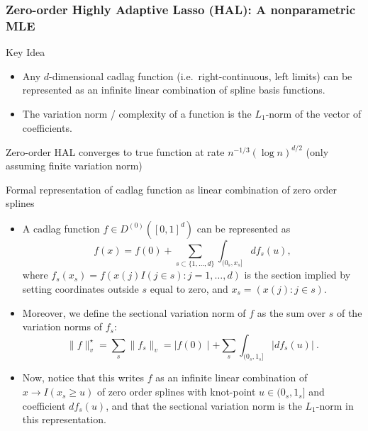 \documentclass[t]{beamer}
\begin{document}
\begin{frame}
\frametitle{Zero-order Highly Adaptive Lasso (HAL): A nonparametric MLE}
\begin{block}{\large{Key Idea}}
\begin{itemize}
\vspace{.1in}
\item Any $d$-dimensional cadlag function (i.e.~right-continuous, left limits)
can be represented as an infinite linear combination of spline basis functions.
\vspace{.05in}
\item The variation norm / complexity of a function is the $L_1$-norm of the vector of coefficients.
\vspace{.1in}
\end{itemize}
\end{block}
\vspace{0.25in}
\begin{center}
{\large Zero-order HAL converges to true function at rate $n^{-1/3}(\log n)^{d/2}$ (only assuming finite variation norm)}
\end{center}
\end{frame}

\begin{frame}{Formal representation of cadlag function as linear combination of zero order splines}
\begin{itemize}
\item A cadlag function $f\in D^{(0)}([0,1]^d)$ can be represented as
\[
f(x)=f(0)+\sum_{s\subset\{1,\ldots,d\}}\int_{(0_s,x_s]}df_s(u),\]
where $f_s(x_s)=f(x(j)I(j\in s): j=1,\ldots,d)$ is the section implied by setting coordinates outside $s$ equal to zero, and $x_s=(x(j): j\in s)$.
\item Moreover, we define the sectional variation norm of $f$ as the sum over $s$ of the variation norms of $f_s$:
\[
\lVert f\rVert_v^{\star}=\sum_s \lVert f_s \rVert_v=\mid f(0)\mid +\sum_s
\int_{(0_s,1_s]}\lvert df_s(u)\rvert \ .
\]
\end{itemize}
\end{frame}
\begin{frame}
\begin{itemize}
\item Now, notice that this writes $f$ as an infinite linear combination of $x\rightarrow I(x_s\geq u)$ of zero order splines with knot-point $u\in (0_s,1_s]$ and coefficient $df_s(u)$, and that the sectional variation norm is the $L_1$-norm in this representation.
\end{itemize}
\end{frame}
\end{document}

